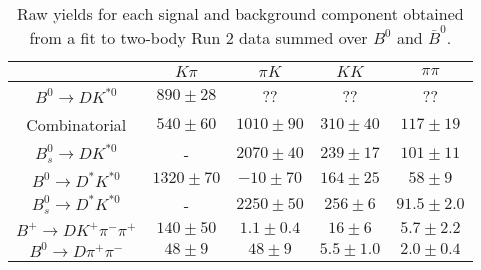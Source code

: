 \begin{table}
  \centering
  \begin{tabular}{ccccc}
      \toprule
       & $K\pi$ & $\pi K$ & $KK$ & $\pi\pi$ \\
      \midrule
      $B^0 \to DK^{*0}$ & $890 \pm 28$ & ?? & ?? & ?? \\
      Combinatorial & $540 \pm 60$ & $1010 \pm 90$ & $310 \pm 40$ & $117 \pm 19$ \\
      $B^0_s \to DK^{*0}$ & \-- & $2070 \pm 40$ & $239 \pm 17$ & $101 \pm 11$ \\
      $B^0 \to D^*K^{*0}$ & $1320 \pm 70$ & $-10 \pm 70$ & $164 \pm 25$ & $58 \pm 9$ \\
      $B^0_s \to D^*K^{*0}$ & \-- & $2250 \pm 50$ & $256 \pm 6$ & $91.5 \pm 2.0$ \\
      $B^+ \to DK^+\pi^-\pi^+$ & $140 \pm 50$ & $1.1 \pm 0.4$ & $16 \pm 6$ & $5.7 \pm 2.2$ \\
      $B^0 \to D\pi^+\pi^-$ & $48 \pm 9$ & $48 \pm 9$ & $5.5 \pm 1.0$ & $2.0 \pm 0.4$ \\
      \bottomrule
      \end{tabular}
  \caption{Raw yields for each signal and background component obtained from a fit to two-body Run 2 data summed over $B^0$ and $\bar{B}^0$.}
\label{tab:yields_combined_2body_run2}
\end{table}
